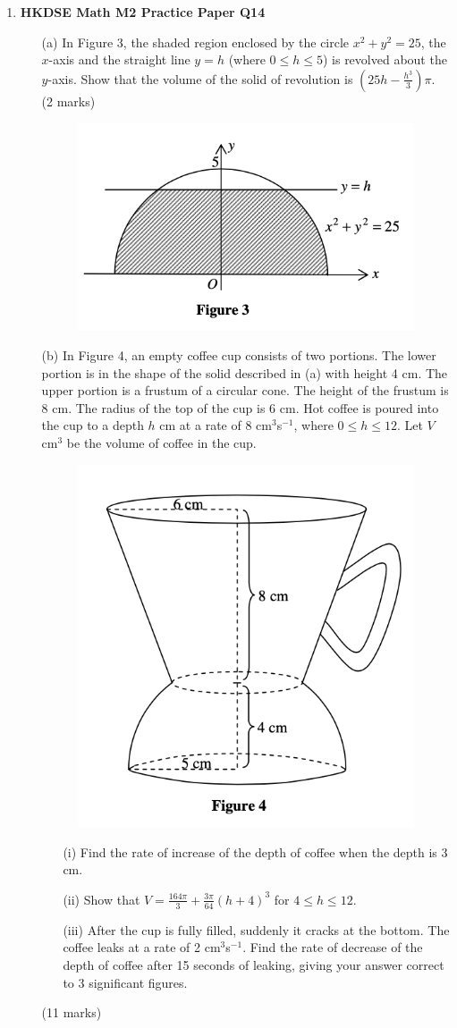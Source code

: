 \documentclass[12pt]{article}
\begin{document}
\begin{enumerate}
	\item \textbf{HKDSE Math M2 Practice Paper Q14}
	\begin{enumerate}
		\item[(a)]In Figure 3, the shaded region enclosed by the circle $x^2 + y^2 = 25$, the $x$-axis and the straight line $y = h$ (where $0 \leq h \leq 5$) is revolved about the $y$-axis. Show that the volume of the solid of revolution is $\left(25h - \displaystyle\frac{h^3}{3}\right)\pi$. \\(2 marks)
		\begin{figure}[H]
			\centering
			\includegraphics[width = .5\linewidth]{PPFigure3}
		\end{figure}		
		\item[(b)]In Figure 4, an empty coffee cup consists of two portions. The lower portion is in the shape of the solid described in (a) with height 4 cm. The upper portion is a frustum of a circular cone. The height of the frustum is 8 cm. The radius of the top of the cup is 6 cm. Hot coffee is poured into the cup to a depth $h$ cm at a rate of 8 cm$^3$s$^{-1}$, where $0 \leq h \leq 12$. Let $V$ cm$^3$ be the volume of coffee in the cup. 
		\begin{figure}[H]
			\centering
			\includegraphics[width = .5\linewidth]{PPFigure4}
		\end{figure}
		\begin{enumerate}
			\item [(i)]Find the rate of increase of the depth of coffee when the depth is 3 cm.
			\item [(ii)]Show that $V = \displaystyle\frac{164\pi}{3} + \frac{3\pi}{64}(h+4)^3$ for $4\leq h \leq 12$. 
			\item [(iii)]After the cup is fully filled, suddenly it cracks at the bottom. The coffee leaks at a rate of 2 cm$^3$s$^{-1}$. Find the rate of decrease of the depth of coffee after 15 seconds of leaking, giving your answer correct to 3 significant figures.
		\end{enumerate}
		(11 marks)
	\end{enumerate}
\end{enumerate}
\end{document}
